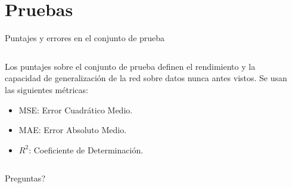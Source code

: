 \documentclass[10pt]{beamer}
\begin{document}
\section*{Pruebas}
\begin{frame}{Puntajes y errores en el conjunto de prueba}
    \begin{columns}
        \begin{column}{0.4\textwidth}
            \small{Los puntajes sobre el conjunto de prueba definen el rendimiento y la capacidad de generalización de la 
            red sobre datos nunca antes vistos. Se usan las siguientes métricas:}
    
            \begin{itemize}
                \item \alert{MSE}: Error Cuadrático Medio.
                \item \alert{MAE}: Error Absoluto Medio.
                \item \alert{$R^2$}: Coeficiente de Determinación.
            \end{itemize}
        \end{column}
        \begin{column}{0.6\textwidth}
            \begin{table}[!h]
                \centering
                \caption[Evaluación de puntajes sobre el conjunto de prueba.]{Evaluación de puntajes sobre el conjunto de prueba. Fuente: Elaboración propia.}
                \label{tbl:testscores}
            \end{table}
        \end{column}
    \end{columns}
\end{frame}


{
\begin{frame}[standout]
  Preguntas?
\end{frame}
}
\end{document}
